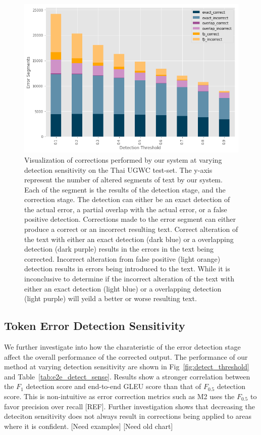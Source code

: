 \begin{figure}
    \centering
    \label{fig:thresholding_prediction}
    \includegraphics[width=12.5cm]{diagrams/thresholding-prediction.png}
    \caption{Visualization of corrections performed by our system at varying detection sensitivity on the Thai UGWC test-set. The y-axis represent the number of altered segments of text by our system. Each of the segment is the results of the detection stage, and the correction stage. The detection can either be an exact detection of the actual error, a partial overlap with the actual error, or a false positive detection. Corrections made to the error segment can either produce a correct or an incorrect resulting text. Correct alteration of the text with either an exact detection (dark blue) or a overlapping detection (dark purple) results in the errors in the text being corrected. Incorrect alteration from false positive (light orange) detection results in errors being introduced to the text. While it is inconclusive to determine if the incorrect alteration of the text with either an exact detection (light blue) or a overlapping detection (light purple) will yeild a better or worse resulting text.}
\end{figure}

\subsection*{Token Error Detection Sensitivity}
We further investigate into how the charateristic of the error detection stage affect the overall performance of the corrected output. The performance of our method at varying detection sensitivity are shown in Fig~\ref{fig:detect_threshold} and Table~\ref{tab:e2e_detect_sense}. Results show a stronger correlation between the $F_1$ detection score and end-to-end GLEU score than that of $F_{0.5}$ detection score. This is non-intuitive as error correction metrics such as M2 uses the $F_{0.5}$ to favor precision over recall [REF]. Further investigation shows that decreasing the deteciton sensitivity does not always result in corrections being applied to areas where it is confident. [Need examples] [Need old chart]

